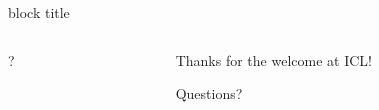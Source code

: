 \documentclass{beamer}
\begin{document}



\begin{frame}[plain]{}
  \begin{beamercolorbox}[wd=\paperwidth, ht=\paperheight, sep=15pt]{block title}%

    \vspace{-20cm}

    \begin{columns}
      \begin{column}{0.2\textwidth}

        \vspace{-2cm}

        \hspace{1cm}  {\gargantuan ?}
      \end{column}
      \begin{column}{0.8\textwidth}

        \vspace{-2cm}

        \vspace{0.3cm}

        {\huge Thanks for the welcome at ICL!}

        {\huge Questions?}

      \end{column}
    \end{columns}


  \end{beamercolorbox}

  \vspace{2cm}

\end{frame}
\end{document}
